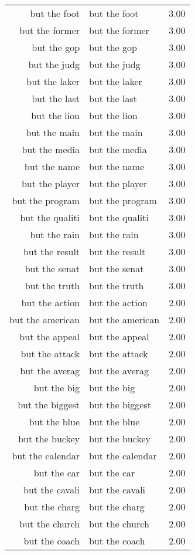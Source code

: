 \begin{table}[ht]
\begin{tabular}{rlr}
  but the foot & but the foot & 3.00 \\ 
  but the former & but the former & 3.00 \\ 
  but the gop & but the gop & 3.00 \\ 
  but the judg & but the judg & 3.00 \\ 
  but the laker & but the laker & 3.00 \\ 
  but the last & but the last & 3.00 \\ 
  but the lion & but the lion & 3.00 \\ 
  but the main & but the main & 3.00 \\ 
  but the media & but the media & 3.00 \\ 
  but the name & but the name & 3.00 \\ 
  but the player & but the player & 3.00 \\ 
  but the program & but the program & 3.00 \\ 
  but the qualiti & but the qualiti & 3.00 \\ 
  but the rain & but the rain & 3.00 \\ 
  but the result & but the result & 3.00 \\ 
  but the senat & but the senat & 3.00 \\ 
  but the truth & but the truth & 3.00 \\ 
  but the action & but the action & 2.00 \\ 
  but the american & but the american & 2.00 \\ 
  but the appeal & but the appeal & 2.00 \\ 
  but the attack & but the attack & 2.00 \\ 
  but the averag & but the averag & 2.00 \\ 
  but the big & but the big & 2.00 \\ 
  but the biggest & but the biggest & 2.00 \\ 
  but the blue & but the blue & 2.00 \\ 
  but the buckey & but the buckey & 2.00 \\ 
  but the calendar & but the calendar & 2.00 \\ 
  but the car & but the car & 2.00 \\ 
  but the cavali & but the cavali & 2.00 \\ 
  but the charg & but the charg & 2.00 \\ 
  but the church & but the church & 2.00 \\ 
  but the coach & but the coach & 2.00 \\ 

\end{tabular}
\end{table}
